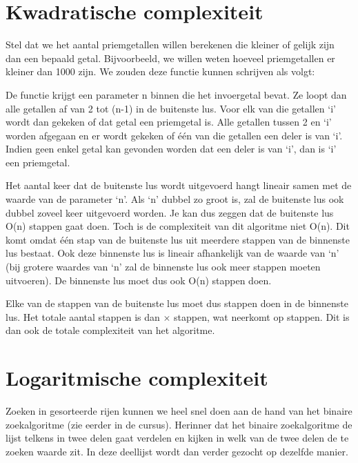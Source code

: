 \section{Kwadratische complexiteit}

Stel dat we het aantal priemgetallen willen berekenen die kleiner of gelijk zijn dan een bepaald getal. Bijvoorbeeld, we willen weten hoeveel priemgetallen er kleiner dan 1000 zijn. We zouden deze functie kunnen schrijven als volgt:


De functie krijgt een parameter n binnen die het invoergetal bevat. Ze loopt dan alle getallen af van 2 tot (n-1) in de buitenste lus. Voor elk van die getallen `i' wordt dan gekeken of dat getal een priemgetal is. Alle getallen tussen 2 en `i' worden afgegaan en er wordt gekeken of \'e\'en van die getallen een deler is van `i'. Indien geen enkel getal kan gevonden worden dat een deler is van `i', dan is `i' een priemgetal.

Het aantal keer dat de buitenste lus wordt uitgevoerd hangt lineair samen met de waarde van de parameter `n'. Als `n' dubbel zo groot is, zal de buitenste lus ook dubbel zoveel keer uitgevoerd worden. Je kan dus zeggen dat de buitenste lus O(n) stappen gaat doen. Toch is de complexiteit van dit algoritme niet O(n). Dit komt omdat \'e\'en stap van de buitenste lus uit meerdere stappen van de binnenste lus bestaat. Ook deze binnenste lus is lineair afhankelijk van de waarde van `n' (bij grotere waardes van `n' zal de binnenste lus ook meer stappen moeten uitvoeren). De binnenste lus moet dus ook O(n) stappen doen.

Elke van de \compn stappen van de buitenste lus moet dus \compn stappen doen in de binnenste lus. Het totale aantal stappen is dan \compn $\times$ \compn stappen, wat neerkomt op \compnk stappen. Dit is dan ook de totale complexiteit van het algoritme.

\section{Logaritmische complexiteit}

Zoeken in gesorteerde rijen kunnen we heel snel doen aan de hand van het binaire zoekalgoritme (zie eerder in de cursus). Herinner dat het binaire zoekalgoritme de lijst telkens in twee delen gaat verdelen en kijken in welk van de twee delen de te zoeken waarde zit. In deze deellijst wordt dan verder gezocht op dezelfde manier.

